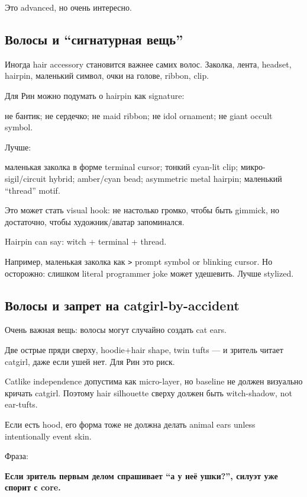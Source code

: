 Это advanced, но очень интересно.

\subsection*{Волосы и ``сигнатурная вещь''}

Иногда hair accessory становится важнее самих волос. Заколка, лента,
headset, hairpin, маленький символ, очки на голове, ribbon, clip.

Для Рин можно подумать о hairpin как signature:

не бантик; не сердечко; не maid ribbon; не idol ornament; не giant
occult symbol.

Лучше:

маленькая заколка в форме terminal cursor; тонкий cyan-lit clip;
микро-sigil/\hspace{0pt}circuit hybrid; amber/\hspace{0pt}cyan bead; asymmetric metal hairpin;
маленький ``thread'' motif.

Это может стать visual hook: не настолько громко, чтобы быть gimmick, но
достаточно, чтобы художник/\hspace{0pt}аватар запоминался.

Hairpin can say: witch + terminal + thread.

Например, маленькая заколка как \texttt{\textgreater{}} prompt symbol or
blinking cursor. Но осторожно: слишком literal programmer joke может
удешевить. Лучше stylized.

\subsection*{Волосы и запрет на catgirl-by-accident}

Очень важная вещь: волосы могут случайно создать cat ears.

Две острые пряди сверху, hoodie+hair shape, twin tufts --- и зритель
читает catgirl, даже если ушей нет. Для Рин это риск.

Catlike independence допустима как micro-layer, но baseline не должен
визуально кричать catgirl. Поэтому hair silhouette сверху должен быть
witch-shadow, not ear-tufts.

Если есть hood, его форма тоже не должна делать animal ears unless
intentionally event skin.

Фраза:

\textbf{Если зритель первым делом спрашивает ``а у неё ушки?'', силуэт
уже спорит с core.}

